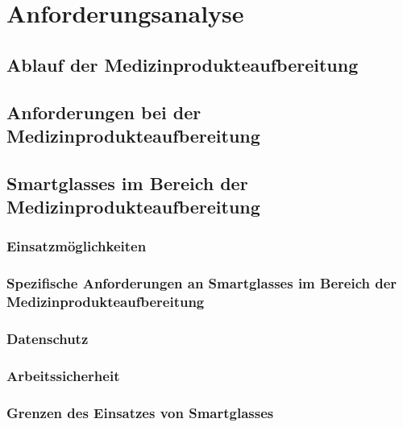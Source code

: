 \chapter{Anforderungsanalyse}
\section{Ablauf der Medizinprodukteaufbereitung}
\section{Anforderungen bei der Medizinprodukteaufbereitung}
\section{Smartglasses im Bereich der Medizinprodukteaufbereitung}
\subsection{Einsatzmöglichkeiten}
\subsection{Spezifische Anforderungen an Smartglasses im Bereich der Medizinprodukteaufbereitung}
\subsection{Datenschutz}
\subsection{Arbeitssicherheit}
\subsection{Grenzen des Einsatzes von Smartglasses}
